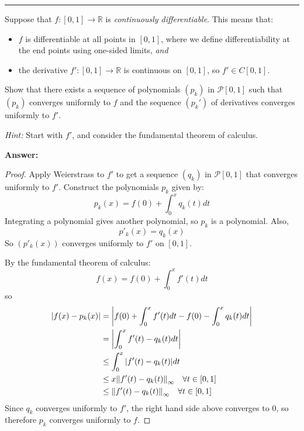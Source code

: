 \documentclass[11pt]{article}
\newcounter{problem}
\newenvironment{problem}{%
    \newpage
    \refstepcounter{problem}%
    \Needspace{7\baselineskip}%
    \par\vspace{0.7em}%
    \noindent\textcolor{courseblue}{\rule{\textwidth}{0.4pt}}%
    \par\vspace{0.5em}%
    \begin{list}{}{%
        \setlength{\leftmargin}{2.3em}%
        \setlength{\labelwidth}{1.8em}%
        \setlength{\labelsep}{0.5em}%
        \setlength{\topsep}{0pt}%
        \setlength{\partopsep}{0pt}%
    }%
    \item[{[\theproblem]}]
}{%
    \end{list}
    \par\vspace{0.5em}
}
\newenvironment{answer}{%
    \Needspace{4\baselineskip}%
    \par\vspace{0.35em}
    \noindent\textbf{Answer:}\par
}{%
    \par\vspace{0.25em}
}
\begin{document}
\begin{problem}
Suppose that $f:[0,1]\to\mathbb{R}$ is \emph{continuously differentiable}.
This means that:
\begin{itemize}
    \item $f$ is differentiable at all points in $[0,1]$, where we define
    differentiability at the end points using one-sided limits, \emph{and}
    \item the derivative $f':[0,1]\to\mathbb{R}$ is continuous on $[0,1]$,
    so $f'\in C[0,1]$.
\end{itemize}
Show that there exists a sequence of polynomials $(p_k)$ in
$\mathcal{P}[0,1]$ such that $(p_k)$ converges uniformly to $f$ and the
sequence $(p_k')$ of derivatives converges uniformly to $f'$.

\emph{Hint:} Start with $f'$, and consider the fundamental theorem of calculus.
\begin{answer}
    \begin{proof}
        Apply Weierstrass to $f'$ to get a sequence $(q_k)$ in $\mathcal{P}[0,1]$ that converges uniformly to $f'$.
        Construct the polynomials $p_k$ given by:
        \[p_k(x) = f(0) + \int_{0}^{x}q_k(t)dt\]
        Integrating a polynomial gives another polynomial, so $p_k$ is a polynomial.
        Also,
        \[p'_k(x) = q_k(x)\]
        So $(p'_k(x))$ converges uniformly to $f'$ on $[0,1]$.

        By the fundamental theorem of calculus:
        \[f(x) = f(0) + \int_{0}^{x}f'(t)dt\]
        so
        \begin{align*}
            \abs{f(x) - p_k(x)} & = \abs{f(0) + \int_{0}^{x}f'(t)dt - f(0) - \int_{0}^{x}q_k(t)dt}\\
            & = \abs{\int_{0}^{x}f'(t) - q_k(t)dt}\\
            & \leq \int_{0}^{x}\abs{f'(t) - q_k(t)}dt\\
            & \leq x \norm{f'(t) - q_k(t)}_\infty \quad \forall t\in[0,1]\\
            & \leq \norm{f'(t) - q_k(t)}_\infty \quad \forall t\in[0,1]
        \end{align*}
        Since $q_k$ converges uniformly to $f'$, the right hand side above converges to $0$, so therefore $p_k$ converges uniformly to $f$.
    \end{proof}
\end{answer}
\end{problem}
\end{document}
